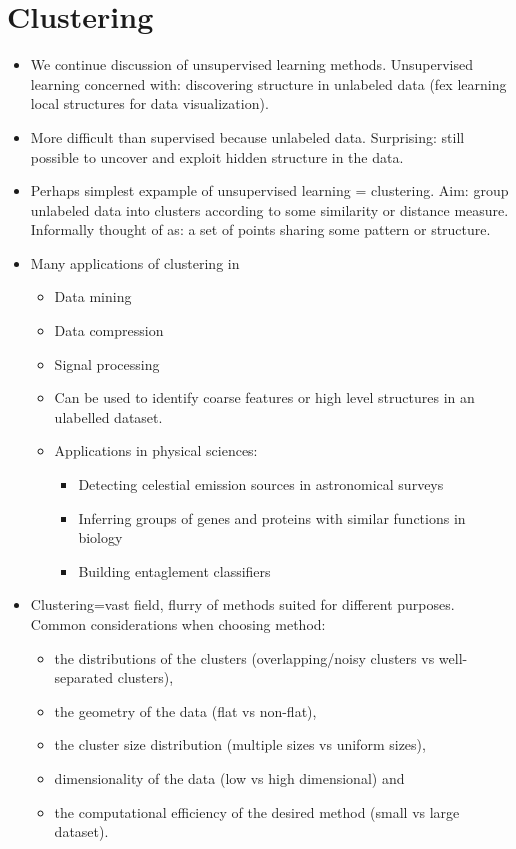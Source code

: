 \documentclass[norsk,a4paper,11pt]{article}
\begin{document}
\section{Clustering}
\begin{itemize}
	\item We continue discussion of unsupervised learning methods. Unsupervised learning concerned with: discovering structure in unlabeled data (fex learning local structures for data visualization).
	\item More difficult than supervised because unlabeled data. Surprising: still possible to uncover and exploit hidden structure in the data.
	\item Perhaps simplest expample of unsupervised learning = clustering. Aim: group unlabeled data into clusters according to some similarity or distance measure. Informally thought of as: a set of points sharing some pattern or structure.
	\item Many applications of clustering in
	\begin{itemize}
		\item Data mining
		\item Data compression
		\item Signal processing
		\item Can be used to identify coarse features or high level structures in an ulabelled dataset.
		\item Applications in physical sciences:
		\begin{itemize}
			\item Detecting celestial emission sources in astronomical surveys
			\item Inferring groups of genes and proteins with similar functions in biology
			\item Building entaglement classifiers
		\end{itemize}
	\end{itemize}
	\item Clustering=vast field, flurry of methods suited for different purposes. Common considerations when choosing method: 
	\begin{itemize}
		\item the distributions of the clusters (overlapping/noisy clusters vs well-separated clusters), 
		\item the geometry of the data (flat vs non-flat), 
		\item the cluster size distribution (multiple sizes vs uniform sizes), 
		\item dimensionality of the data (low vs high dimensional) and 
		\item the computational efficiency of the desired method (small vs large dataset).
	\end{itemize}
\end{itemize}
\end{document}
